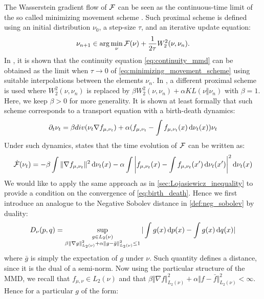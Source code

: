 The Wasserstein gradient flow of ${{\mathcal F}}$ can be seen as the continuous-time limit of the so called minimizing movement scheme \cite{ambrosio2008gradient}. Such proximal scheme is defined using an initial distribution $\nu_0$, a step-size $\tau$, and an iterative update equation:
\begin{align}\label{eq:minimizing_movement_scheme}
	\nu_{n+1} \in \arg \min _{\nu} {{\mathcal F}}(\nu) + \frac{1}{2\tau} W_2^2(\nu,\nu_n).
\end{align}
In \cite{ambrosio2008gradient}, it is shown that the continuity equation \cref{eq:continuity_mmd} can be obtained as the limit when $\tau \rightarrow 0$ of \cref{eq:minimizing_movement_scheme} using suitable interpolations between the elements $\nu_n$.
In \cite{rotskoff2019global}, a different proximal scheme is used where $W_2^2(\nu,\nu_n)$ is replaced by $\beta W_2^2(\nu,\nu_n) + \alpha KL(\nu\Vert \nu_n)$ with $\beta=1$. Here, we keep $\beta>0$ for more generality. It is shown at least formally that such scheme corresponds to a transport equation with a birth-death dynamics:
\[
\partial_t \nu_t = \beta div(\nu_t \nabla f_{\mu,\nu_t}) + \alpha(f_{\mu,\nu_t} - \int f_{\mu,\nu_t}(x)\mathop{}\!\mathrm{d} \nu_t(x) )\nu_t
\]
Under such dynamics, \cite[Proposition 3.1]{rotskoff2019global} states that the time evolution of ${{\mathcal F}}$ can be written as:
\begin{align}\label{eq:birth_death}
\dot{{{\mathcal F}}}(\nu_t) = -\beta\int \Vert \nabla f_{\mu,\nu_t}\Vert^2 \mathop{}\!\mathrm{d} \nu_t(x) -\alpha \int \left | f_{\mu,\nu_t}(x)-\int f_{\mu,\nu_t}(x')\mathop{}\!\mathrm{d} \nu_t(x')\right |^2\mathop{}\!\mathrm{d} \nu_t(x) 
\end{align}
We would like to apply the same approach as in \cref{sec:Lojasiewicz_inequality} to provide a condition on the convergence of \cref{eq:birth_death}. 
Hence we first introduce an analogue to the Negative Sobolev distance in \cref{def:neg_sobolev} by duality:
\begin{align}
	D_{\nu}(p,q) =\sup_{\substack{g\in L_2(\nu)\\ \beta \Vert \nabla g \Vert^2_{L_2(\nu)} +\alpha  \Vert g- \bar{g}  \Vert^2_{L_2(\nu)}  \leq 1 }} \vert \int g(x)\mathop{}\!\mathrm{d} p(x) - \int g(x) \mathop{}\!\mathrm{d} q(x)\vert 
\end{align}
where $\bar{g}$ is simply the expectation of $g$ under $\nu$.
Such quantity defines a distance, since it is the dual of a semi-norm. Now using the particular structure of the MMD, we recall that $f_{\mu,\nu}\in L_2(\nu)$ and that $\beta \Vert \nabla f \Vert^2_{L_2(\nu)} +\alpha  \Vert f- \bar{f}  \Vert^2_{L_2(\nu)}<\infty$. Hence for a particular $g$ of the form:
